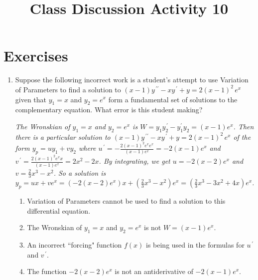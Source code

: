 \documentclass{ximera}
\begin{document}
\begin{abstract}
 \end{abstract}

    \title{Class Discussion Activity 10}
    
    \maketitle

\section*{Exercises}



\begin{enumerate}[label=(\arabic*)]

\item Suppose the following incorrect work is a student's attempt to use Variation of Parameters to find a solution to $(x-1)y^{\,\prime\prime}-xy^{\,\prime}+y=2(x-1)^2\,e^{x}$ given that $y_1=x$ and $y_2=e^x$ form a fundamental set of solutions to the complementary equation.  What error is this student making?

\emph{The Wronskian of $y_1=x$ and $y_2=e^x$ is $W=y_1y_2^{\,\prime}-y_1^{\prime}y_2=(x-1)e^x$.  Then there is a particular solution to $(x-1)y^{\,\prime\prime}-xy^{\,\prime}+y=2(x-1)^2\,e^{x}$ of the form $y_p=uy_1+vy_2$ where $\displaystyle u^{\,\prime}=-\frac{2(x-1)^2e^{x}e^x}{(x-1)e^x}=-2(x-1)e^{x}$ and \\ $\displaystyle v^{\,\prime}=\frac{2(x-1)^2e^{x}x}{(x-1)e^x}=2x^2-2x$.  By integrating, we get $u=-2(x-2)e^x$ and $\displaystyle v=\frac{2}{3}x^3-x^2$.  So a solution is \\$y_p=ux+ve^x=(-2(x-2)e^x)x+\left(\frac{2}{3}x^3-x^2\right)e^x=\left(\frac{2}{3}x^3-3x^2+4x\right)e^x$. }


\begin{enumerate}[label=(\alph*)]

\item Variation of Parameters cannot be used to find a solution to this differential equation.

\item The Wronskian of $y_1=x$ and $y_2=e^x$ is not $W=(x-1)e^x$.

\item An incorrect ``forcing" function $f(x)$ is being used in the formulas for $u^{\,\prime}$ and $v^{\,\prime}$.  %

\item The function $-2(x-2)e^x$ is not an antiderivative of $-2(x-1)e^{x}$.


\end{enumerate}
\end{enumerate}
\end{document}
